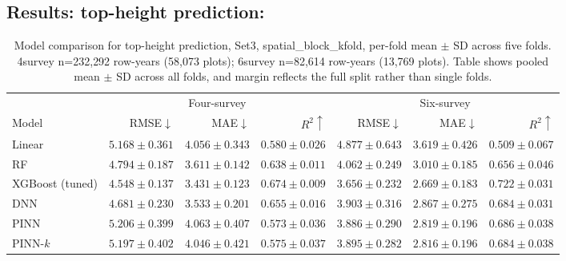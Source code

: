 \documentclass[logo,msc,ai]{infthesis}           %
\begin{document}
\subsection{Results: top-height prediction:}
\begin{table}[!htbp]
\centering
\scriptsize
\setlength{\tabcolsep}{4pt}
\renewcommand{\arraystretch}{1.2}
\begin{tabular}{lrrrrrr}
\toprule
& \multicolumn{3}{c}{Four-survey} & \multicolumn{3}{c}{Six-survey} \\
\cmidrule(lr){2-4} \cmidrule(lr){5-7}
Model & RMSE${\downarrow}$ & MAE${\downarrow}$ & $R^2{\uparrow}$ & RMSE${\downarrow}$ & MAE${\downarrow}$ & $R^2{\uparrow}$ \\
\midrule
Linear & $5.168{\pm}0.361$ & $4.056{\pm}0.343$ & $0.580{\pm}0.026$ & $4.877{\pm}0.643$ & $3.619{\pm}0.426$ & $0.509{\pm}0.067$ \\
RF & $4.794{\pm}0.187$ & $3.611{\pm}0.142$ & $0.638{\pm}0.011$ & $4.062{\pm}0.249$ & $3.010{\pm}0.185$ & $0.656{\pm}0.046$ \\
XGBoost (tuned) & $\mathbf{4.548{\pm}0.137}$ & $\mathbf{3.431{\pm}0.123}$ & $\mathbf{0.674{\pm}0.009}$ & $\mathbf{3.656{\pm}0.232}$ & $\mathbf{2.669{\pm}0.183}$ & $\mathbf{0.722{\pm}0.031}$ \\
DNN & $4.681{\pm}0.230$ & $3.533{\pm}0.201$ & $0.655{\pm}0.016$ & $3.903{\pm}0.316$ & $2.867{\pm}0.275$ & $0.684{\pm}0.031$ \\
PINN & $5.206{\pm}0.399$ & $4.063{\pm}0.407$ & $0.573{\pm}0.036$ & $3.886{\pm}0.290$ & $2.819{\pm}0.196$ & $0.686{\pm}0.038$ \\
PINN-$k$ & $5.197{\pm}0.402$ & $4.046{\pm}0.421$ & $0.575{\pm}0.037$ & $3.895{\pm}0.282$ & $2.816{\pm}0.196$ & $0.684{\pm}0.038$ \\
\bottomrule
\end{tabular}
\caption{Model comparison for top-height prediction, Set3, spatial\_block\_kfold,
per-fold mean $\pm$ SD across five folds. 4survey n=232{,}292 row-years (58{,}073
plots); 6survey n=82{,}614 row-years (13{,}769 plots). Table shows pooled mean $\pm$ SD across all folds, and margin reflects the full split rather than single folds.}
\label{tab:results-rq1}
\end{table}
\end{document}
